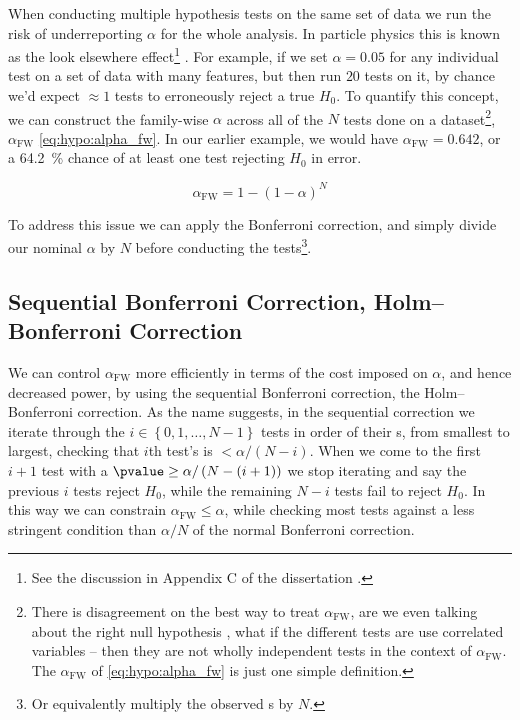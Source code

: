 When conducting multiple hypothesis tests on the same set of data
we run the risk of underreporting $\alpha$ for the whole analysis.
In particle physics this is known as the look elsewhere effect\footnote{See the discussion in Appendix C of the dissertation \cite{mepland_dissertation}.}
\cite{Demortier:2007zz,lyons2008,Gross2010,Ranucci:2012ed}.
For example, if we set $\alpha = \num{0.05}$ for any individual test
on a set of data with many features, but then run $\num{20}$
tests on it, by chance we'd expect $\approx \num{1}$ tests
to erroneously reject a true $H_{0}$.
To quantify this concept, we can construct
the family-wise $\alpha$ across all of the $N$ tests done on a dataset\footnote{There is
disagreement on the best way to treat $\alpha_{\text{FW}}$,
\eg are we even talking about the right null hypothesis \cite{Perneger1236},
what if the different tests are use correlated variables -- then they are not wholly independent tests in the context of $\alpha_{\text{FW}}$.
The $\alpha_{\text{FW}}$ of \cref{eq:hypo:alpha_fw} is just one simple definition.},
$\alpha_{\text{FW}}$ \cref{eq:hypo:alpha_fw}.
In our earlier example, we would have $\alpha_{\text{FW}} = \num{0.642}$,
or a \SI{64.2}{\percent} chance of at least one test rejecting $H_{0}$ in error.

\begin{equation}\label{eq:hypo:alpha_fw}
\alpha_{\text{FW}} = 1 - \left(1 - \alpha\right)^{N}
\end{equation}

To address this issue we can apply the Bonferroni correction,
and simply divide our nominal $\alpha$ by $N$
before conducting the tests\footnote{Or equivalently multiply the observed {\pvalue}s by $N$.}.

\subsection{Sequential Bonferroni Correction, \texorpdfstring{\ie}{ie} Holm--Bonferroni Correction}
\label{hypo:bonferroni_correction:sequential}

We can control $\alpha_{\text{FW}}$ more efficiently in terms of the cost imposed on $\alpha$, and hence decreased power,
by using the sequential Bonferroni correction, \ie the Holm--Bonferroni correction.
As the name suggests, in the sequential correction
we iterate through the $i \in \left\{0, 1, \ldots, N-1\right\}$ tests
in order of their {\pvalue}s, from smallest to largest,
checking that $i$th test's \pvalue is $< \alpha / \left(N-i\right)$.
When we come to the first $i+1$ test with a $\pvalue \geq \alpha / \left(N-\left(i+1\right)\right)$
we stop iterating and say the previous $i$ tests reject $H_{0}$,
while the remaining $N-i$ tests fail to reject $H_{0}$.
In this way we can constrain $\alpha_{\text{FW}} \leq \alpha$,
while checking most tests against a less stringent condition
than $\alpha / N$ of the normal Bonferroni correction.

